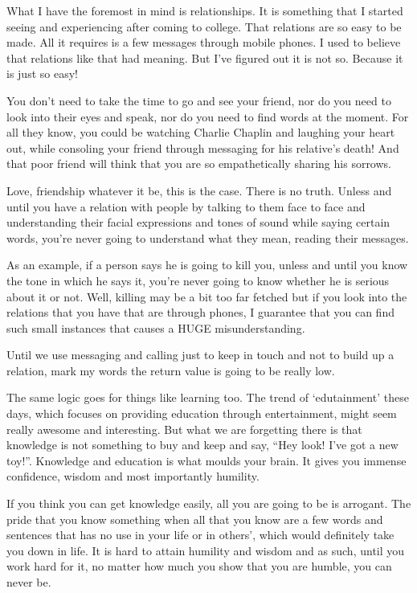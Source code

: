 \documentclass[twoside,11pt,titlepage]{article}
\begin{document}
What I have the foremost in mind is relationships. It is something that I started seeing and experiencing after coming to college. That relations are so easy to be made. All it requires is a few messages through mobile phones. I used to believe that relations like that had meaning. But I've figured out it is not so. Because it is just so easy!

You don't need to take the time to go and see your friend, nor do you need to look into their eyes and speak, nor do you need to find words at the moment. For all they know, you could be watching Charlie Chaplin and laughing your heart out, while consoling your friend through messaging for his relative's death! And that poor friend will think that you are so empathetically sharing his sorrows.

Love, friendship whatever it be, this is the case. There is no truth. Unless and until you have a relation with people by talking to them face to face and understanding their facial expressions and tones of sound while saying certain words, you're never going to understand what they mean, reading their messages.

As an example, if a person says he is going to kill you, unless and until you know the tone in which he says it, you're never going to know whether he is serious about it or not. Well, killing may be a bit too far fetched but if you look into the relations that you have that are through phones, I guarantee that you can find such small instances that causes a HUGE misunderstanding.

Until we use messaging and calling just to keep in touch and not to build up a relation, mark my words the return value is going to be really low.

The same logic goes for things like learning too. The trend of `edutainment' these days, which focuses on providing education through entertainment, might seem really awesome and interesting. But what we are forgetting there is that knowledge is not something to buy and keep and say, ``Hey look! I've got a new toy!''. Knowledge and education is what moulds your brain. It gives you immense confidence, wisdom and most importantly humility.

If you think you can get knowledge easily, all you are going to be is arrogant. The pride that you know something when all that you know are a few words and sentences that has no use in your life or in others', which would definitely take you down in life. It is hard to attain humility and wisdom and as such, until you work hard for it, no matter how much you show that you are humble, you can never be.
\end{document}
